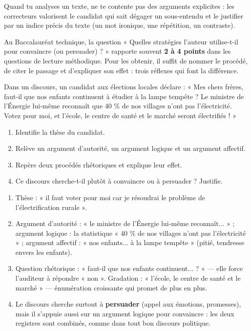 \documentclass[11pt]{article}
\newcommand{\cle}[1]{{\popxbold\color{popdark}#1}}
\begin{document}
\begin{attention}[Au Bac]
Quand tu analyses un texte, ne te contente pas des arguments explicites : les correcteurs valorisent le candidat qui sait dégager un \cle{sous-entendu} et le justifier par un indice précis du texte (un mot ironique, une répétition, un contraste).
\end{attention}

\begin{savaistu}
Au Baccalauréat technique, la question « Quelles stratégies l'auteur utilise-t-il pour convaincre (ou persuader) ? » rapporte souvent \textbf{2 à 4 points} dans les questions de lecture méthodique. Pour les obtenir, il suffit de nommer le procédé, de citer le passage et d'expliquer son effet : trois réflexes qui font la différence.
\end{savaistu}

\begin{exercice}[Entraînement]
Dans un discours, un candidat aux élections locales déclare : « Mes chers frères, faut-il que nos enfants continuent à étudier à la lampe tempête ? Le ministre de l'Énergie lui-même reconnaît que 40 \% de nos villages n'ont pas l'électricité. Votez pour moi, et l'école, le centre de santé et le marché seront électrifiés ! »
\begin{enumerate}
\item Identifie la thèse du candidat.
\item Relève un argument d'autorité, un argument logique et un argument affectif.
\item Repère deux procédés rhétoriques et explique leur effet.
\item Ce discours cherche-t-il plutôt à convaincre ou à persuader ? Justifie.
\end{enumerate}
\end{exercice}

\begin{corrige}[Exercice]
\begin{enumerate}
\item Thèse : « il faut voter pour moi car je résoudrai le problème de l'électrification rurale ».
\item Argument d'autorité : « le ministre de l'Énergie lui-même reconnaît... » ; argument logique : la statistique « 40 \% de nos villages n'ont pas l'électricité » ; argument affectif : « nos enfants... à la lampe tempête » (pitié, tendresse envers les enfants).
\item Question rhétorique : « faut-il que nos enfants continuent... ? » — elle force l'auditeur à répondre « non ». Gradation : « l'école, le centre de santé et le marché » — énumération croissante qui promet de plus en plus.
\item Le discours cherche surtout à \textbf{persuader} (appel aux émotions, promesses), mais il s'appuie aussi sur un argument logique pour convaincre : les deux registres sont combinés, comme dans tout bon discours politique.
\end{enumerate}
\end{corrige}
\end{document}
